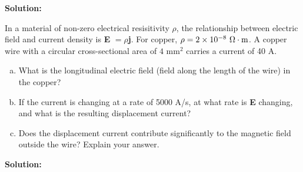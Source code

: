 \documentclass[11pt]{article}
\newcommand{\be}{\begin{enumerate}[a) ]}
\newcommand{\ee}{\end{enumerate}}
\begin{document}
\textbf{Solution:}\\

\clearpage

\begin{problem}
In a material of non-zero electrical resisitivity $\rho$, the relationship between electric field and current
density is \textbf{E} $ = \rho$\textbf{j}. For copper, $\rho = 2 \times 10^{-8}~\mathrm{\Omega\cdot m}$. A copper wire with a circular cross-sectional
area of $4 \text{ mm}^2$
carries a current of 40 A.
\be
\item What is the longitudinal electric field (field along the length of the wire) in the copper?
\item If the current is changing at a rate of 5000 A/s, at what rate is \textbf{E} changing, and what is the
resulting displacement current?
\item Does the displacement current contribute significantly to the magnetic field outside the wire?
Explain your answer.
\ee
\end{problem}


\textbf{Solution:}\\

\clearpage
\end{document}
